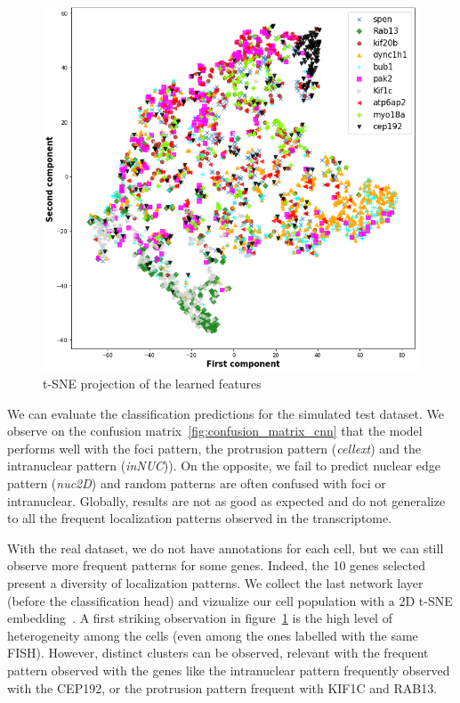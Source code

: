 \begin{figure}[h]
    \centering
    \includegraphics[width=\textwidth]{figures/appendix/tsne_cnn}
    \caption{t-SNE projection of the learned features}
    \label{fig:tsne_cnn}
\end{figure}

We can evaluate the classification predictions for the simulated test dataset.
We observe on the confusion matrix~\ref{fig:confusion_matrix_cnn} that the model performs well with the foci pattern, the protrusion pattern (\emph{cellext}) and the intranuclear pattern (\emph{inNUC})).
On the opposite, we fail to predict nuclear edge pattern (\emph{nuc2D}) and random patterns are often confused with foci or intranuclear.
Globally, results are not as good as expected and do not generalize to all the frequent localization patterns observed in the transcriptome.

With the real dataset, we do not have annotations for each cell, but we can still observe more frequent patterns for some genes.
Indeed, the 10 genes selected present a diversity of localization patterns.
We collect the last network layer (before the classification head) and vizualize our cell population with a 2D t-SNE embedding~\cite{vandermaaten_2008,wattenberg2016}.
A first striking observation in figure~\ref{fig:tsne_cnn} is the high level of heterogeneity among the cells (even among the ones labelled with the same \ac{FISH}).
However, distinct clusters can be observed, relevant with the frequent pattern observed with the genes like the intranuclear pattern frequently observed with the CEP192, or the protrusion pattern frequent with KIF1C and RAB13.

